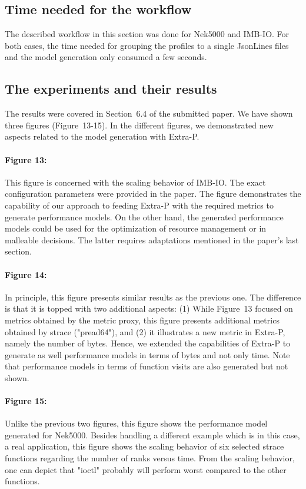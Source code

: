 \subsection{Time needed for the workflow}
The described workflow in this section was done for Nek5000 and IMB-IO. For both cases, the 
time needed for grouping the profiles to a single JsonLines files and the model generation 
only consumed a few seconds. 

\subsection{The experiments and their results}
The results were covered in Section~6.4 of the submitted paper. We have shown three 
figures (Figure~13-15). In the different figures, we demonstrated new aspects related 
to the model generation with Extra-P.
\paragraph*{\textbf{Figure 13:}} This figure is concerned with the scaling behavior of IMB-IO. 
The exact configuration parameters were provided in the paper. The figure demonstrates the capability 
of our approach to feeding Extra-P with the required metrics to generate performance models. On the 
other hand, the generated performance models could be used for the optimization of resource management or 
in malleable decisions. The latter requires adaptations mentioned in the paper's last section.  

\paragraph*{\textbf{Figure 14:}}
In principle, this figure presents similar results as the previous one. The difference is that it is topped with 
two additional aspects: (1) While Figure~13 focused on metrics obtained by the metric proxy, this figure presents 
additional metrics obtained by strace ("pread64"), and (2) it illustrates a new metric in Extra-P, namely the number of bytes. 
Hence, we extended the capabilities of Extra-P to generate as well performance models in terms of bytes and not only time. 
Note that performance models in terms of function visits are also generated but not shown. 

\paragraph*{\textbf{Figure 15:}}
Unlike the previous two figures, this figure shows the performance model generated for Nek5000. 
Besides handling a different example which is in this case, a real application, this figure shows the 
scaling behavior of six selected strace functions regarding the number of ranks versus time. From the 
scaling behavior, one can depict that "ioctl" probably will perform worst compared to the other functions. 

